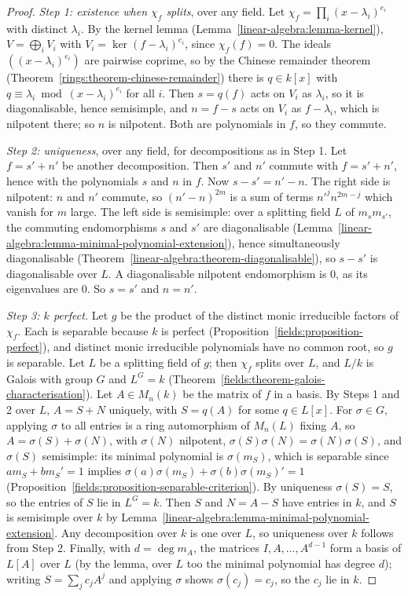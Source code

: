 \begin{proof}
\emph{Step 1: existence when $\chi_f$ splits}, over any field. Let $\chi_f = \prod_i(x - \lambda_i)^{e_i}$ with
distinct $\lambda_i$. By the kernel lemma (Lemma~\ref{linear-algebra:lemma-kernel}), $V = \bigoplus_iV_i$
with $V_i = \ker(f - \lambda_i)^{e_i}$, since $\chi_f(f) = 0$. The ideals $((x - \lambda_i)^{e_i})$ are
pairwise coprime, so by the Chinese remainder theorem (Theorem~\ref{rings:theorem-chinese-remainder})
there is $q \in k[x]$ with $q \equiv \lambda_i \bmod (x - \lambda_i)^{e_i}$ for all $i$. Then $s = q(f)$ acts on
$V_i$ as $\lambda_i$, so it is diagonalisable, hence semisimple, and $n = f - s$ acts on $V_i$ as
$f - \lambda_i$, which is nilpotent there; so $n$ is nilpotent. Both are polynomials in $f$, so they
commute.

\emph{Step 2: uniqueness}, over any field, for decompositions as in Step 1. Let $f = s' + n'$ be another
decomposition. Then $s'$ and $n'$ commute with $f = s' + n'$, hence with the polynomials $s$ and $n$ in
$f$. Now $s - s' = n' - n$. The right side is nilpotent: $n$ and $n'$ commute, so $(n' - n)^{2m}$ is a
sum of terms $n'^jn^{2m-j}$ which vanish for $m$ large. The left side is semisimple: over a splitting
field $L$ of $m_sm_{s'}$, the commuting endomorphisms $s$ and $s'$ are diagonalisable
(Lemma~\ref{linear-algebra:lemma-minimal-polynomial-extension}), hence simultaneously diagonalisable
(Theorem~\ref{linear-algebra:theorem-diagonalisable}), so $s - s'$ is diagonalisable over $L$. A
diagonalisable nilpotent endomorphism is $0$, as its eigenvalues are $0$. So $s = s'$ and $n = n'$.

\emph{Step 3: $k$ perfect.} Let $g$ be the product of the distinct monic irreducible factors of
$\chi_f$. Each is separable because $k$ is perfect (Proposition~\ref{fields:proposition-perfect}), and
distinct monic irreducible polynomials have no common root, so $g$ is separable. Let $L$ be a
splitting field of $g$; then $\chi_f$ splits over $L$, and $L/k$ is Galois with group $G$ and
$L^G = k$ (Theorem~\ref{fields:theorem-galois-characterisation}). Let $A \in M_n(k)$ be the matrix of
$f$ in a basis. By Steps 1 and 2 over $L$, $A = S + N$ uniquely, with $S = q(A)$ for some
$q \in L[x]$. For $\sigma \in G$, applying $\sigma$ to all entries is a ring automorphism of $M_n(L)$
fixing $A$, so $A = \sigma(S) + \sigma(N)$, with $\sigma(N)$ nilpotent, $\sigma(S)\sigma(N) = \sigma(N)\sigma(S)$,
and $\sigma(S)$ semisimple: its minimal polynomial is $\sigma(m_S)$, which is separable since
$am_S + bm_S' = 1$ implies $\sigma(a)\sigma(m_S) + \sigma(b)\sigma(m_S)' = 1$
(Proposition~\ref{fields:proposition-separable-criterion}). By uniqueness $\sigma(S) = S$, so the
entries of $S$ lie in $L^G = k$. Then $S$ and $N = A - S$ have entries in $k$, and $S$ is semisimple
over $k$ by Lemma~\ref{linear-algebra:lemma-minimal-polynomial-extension}. Any decomposition over $k$ is one
over $L$, so uniqueness over $k$ follows from Step 2. Finally, with $d = \deg m_A$, the matrices
$I, A, \ldots, A^{d-1}$ form a basis of $L[A]$ over $L$ (by the lemma, over $L$ too the minimal
polynomial has degree $d$); writing $S = \sum_jc_jA^j$ and applying $\sigma$ shows $\sigma(c_j) = c_j$, so
the $c_j$ lie in $k$.
\end{proof}

